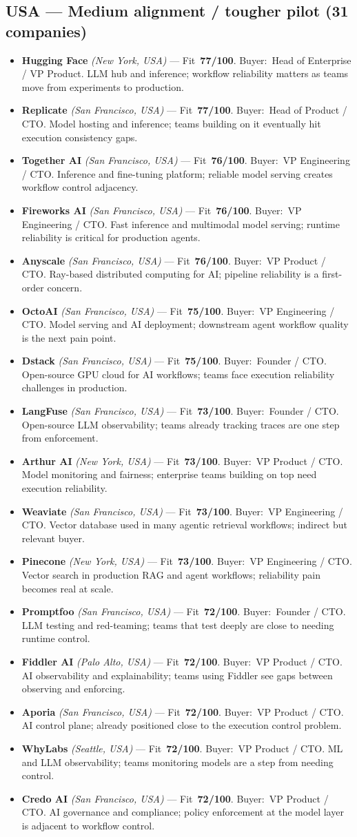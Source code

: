 \documentclass[10pt]{article}
\newcommand{\cand}[5]{\item \textbf{#1} \textit{(#2)} --- Fit~\textbf{#3/100}. Buyer:~#4. #5}
\begin{document}
\subsection{USA --- Medium alignment / tougher pilot (31 companies)}
\begin{itemize}
\cand{Hugging Face}{New York, USA}{77}{Head of Enterprise / VP Product}{LLM hub and inference; workflow reliability matters as teams move from experiments to production.}
\cand{Replicate}{San Francisco, USA}{77}{Head of Product / CTO}{Model hosting and inference; teams building on it eventually hit execution consistency gaps.}
\cand{Together AI}{San Francisco, USA}{76}{VP Engineering / CTO}{Inference and fine-tuning platform; reliable model serving creates workflow control adjacency.}
\cand{Fireworks AI}{San Francisco, USA}{76}{VP Engineering / CTO}{Fast inference and multimodal model serving; runtime reliability is critical for production agents.}
\cand{Anyscale}{San Francisco, USA}{76}{VP Product / CTO}{Ray-based distributed computing for AI; pipeline reliability is a first-order concern.}
\cand{OctoAI}{San Francisco, USA}{75}{VP Engineering / CTO}{Model serving and AI deployment; downstream agent workflow quality is the next pain point.}
\cand{Dstack}{San Francisco, USA}{75}{Founder / CTO}{Open-source GPU cloud for AI workflows; teams face execution reliability challenges in production.}
\cand{LangFuse}{San Francisco, USA}{73}{Founder / CTO}{Open-source LLM observability; teams already tracking traces are one step from enforcement.}
\cand{Arthur AI}{New York, USA}{73}{VP Product / CTO}{Model monitoring and fairness; enterprise teams building on top need execution reliability.}
\cand{Weaviate}{San Francisco, USA}{73}{VP Engineering / CTO}{Vector database used in many agentic retrieval workflows; indirect but relevant buyer.}
\cand{Pinecone}{New York, USA}{73}{VP Engineering / CTO}{Vector search in production RAG and agent workflows; reliability pain becomes real at scale.}
\cand{Promptfoo}{San Francisco, USA}{72}{Founder / CTO}{LLM testing and red-teaming; teams that test deeply are close to needing runtime control.}
\cand{Fiddler AI}{Palo Alto, USA}{72}{VP Product / CTO}{AI observability and explainability; teams using Fiddler see gaps between observing and enforcing.}
\cand{Aporia}{San Francisco, USA}{72}{VP Product / CTO}{AI control plane; already positioned close to the execution control problem.}
\cand{WhyLabs}{Seattle, USA}{72}{VP Product / CTO}{ML and LLM observability; teams monitoring models are a step from needing control.}
\cand{Credo AI}{San Francisco, USA}{72}{VP Product / CTO}{AI governance and compliance; policy enforcement at the model layer is adjacent to workflow control.}

\end{itemize}
\end{document}
